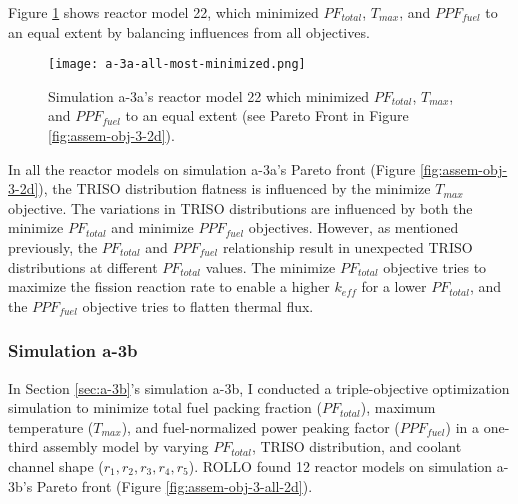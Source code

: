 Figure \ref{fig:a-3a-balanced-reactor-model} shows reactor model 22, which 
minimized $PF_{total}$, $T_{max}$, and $PPF_{fuel}$ to an equal extent by balancing 
influences from all objectives. 
\begin{figure}[htbp!]
    \centering
    \texttt{[image: a-3a-all-most-minimized.png]} 
    \caption{Simulation a-3a's reactor model 22 which minimized $PF_{total}$, $T_{max}$, 
    and $PPF_{fuel}$ to an equal extent (see Pareto Front in 
    Figure \ref{fig:assem-obj-3-2d}).}
\label{fig:a-3a-balanced-reactor-model}
\end{figure}

In all the reactor models on simulation a-3a's Pareto front (Figure 
\ref{fig:assem-obj-3-2d}), the TRISO distribution flatness is influenced by the 
minimize $T_{max}$ objective. 
The variations in \gls{TRISO} distributions are influenced by both the minimize 
$PF_{total}$ and minimize $PPF_{fuel}$ objectives. 
However, as mentioned previously, the $PF_{total}$ and $PPF_{fuel}$ relationship
result in unexpected TRISO distributions at different $PF_{total}$ values. 
The minimize $PF_{total}$ objective tries to maximize the fission reaction rate
to enable a higher $k_{eff}$ for a lower $PF_{total}$, and 
the $PPF_{fuel}$ objective tries to flatten thermal flux. 

\subsubsection{Simulation a-3b}
In Section \ref{sec:a-3b}'s simulation a-3b, I conducted a triple-objective 
optimization simulation to minimize total fuel packing fraction ($PF_{total}$), 
maximum temperature ($T_{max}$), and fuel-normalized power peaking factor 
($PPF_{fuel}$) in a one-third assembly model by varying $PF_{total}$, 
TRISO distribution, and coolant channel shape ($r_1, r_2, r_3, r_4, r_5$).
\gls{ROLLO} found 12 reactor models on simulation a-3b's Pareto 
front (Figure \ref{fig:assem-obj-3-all-2d}).

